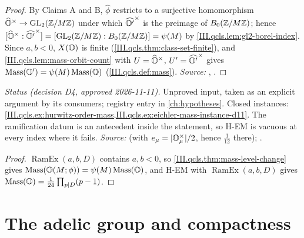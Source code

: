 \begin{proof}
By Claims A and B, $\hat\phi$ restricts to a surjective homomorphism $\widehat{\mathbb{O}}^\times\to\mathrm{GL}_2(\mathbb{Z}/M\mathbb{Z})$ under which $\widehat{\mathbb{O}'}^\times$ is the preimage of
$B_0(\mathbb{Z}/M\mathbb{Z})$; hence $[\widehat{\mathbb{O}}^\times:\widehat{\mathbb{O}'}^\times]=[\mathrm{GL}_2(\mathbb{Z}/M\mathbb{Z}):B_0(\mathbb{Z}/M\mathbb{Z})]=\psi(M)$ by \cref{III.qcls.lem:gl2-borel-index}. Since $a,b<0$,
$X(\mathbb{O})$ is finite (\cref{III.qcls.thm:class-set-finite}), and \cref{III.qcls.lem:mass-orbit-count} with $U=\widehat{\mathbb{O}}^\times$, $U'=\widehat{\mathbb{O}'}^\times$ gives
$\operatorname{Mass}(\mathbb{O}')=\psi(M)\operatorname{Mass}(\mathbb{O})$ (\cref{III.qcls.def:mass}). \emph{Source:} \cite[Def.~2.13, p.~353]{Piz}, \cite[§25.3]{Voi}.
\end{proof}

\begin{hypothesis}
\end{hypothesis}
\noindent \emph{Status (decision D4, approved 2026-11-11).} Unproved input, taken as an explicit argument by its consumers; registry entry in
\cref{ch:hypotheses}. Closed instances: \cref{III.qcls.ex:hurwitz-order-mass,III.qcls.ex:eichler-mass-instance-d11}. The ramification
datum is an antecedent inside the statement, so H-EM is vacuous at every index where it fails. \emph{Source:} \cite[(20)--(21), p.~180]{Shz}
(with $e_\mu=\lvert\mathbb{O}_\mu^\times\rvert/2$, hence $\frac1{12}$ there); \cite[Def.~2.13, p.~353]{Piz}.

\begin{corollary}
\end{corollary}
\begin{proof}
$\operatorname{RamEx}(a,b,D)$ contains $a,b<0$, so \cref{III.qcls.thm:mass-level-change} gives $\operatorname{Mass}(\mathbb{O}(M;\phi))=\psi(M)\operatorname{Mass}(\mathbb{O})$, and H-EM with
$\operatorname{RamEx}(a,b,D)$ gives $\operatorname{Mass}(\mathbb{O})=\frac1{24}\prod_{p\mid D}(p-1)$.
\end{proof}

\section{The adelic group and compactness}\label{sec:qcls-compact}

